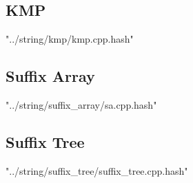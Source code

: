 \documentclass [5pt,twocolumn,oneside]{article}
\begin{document}
\begin{landscape}
\begin{multicols}{3}
\subsection{ KMP}
 {"../string/kmp/kmp.cpp.hash"}


\subsection{ Suffix Array}
 {"../string/suffix_array/sa.cpp.hash"}


\subsection{ Suffix Tree}
 {"../string/suffix_tree/suffix_tree.cpp.hash"}

\end{multicols}
\end{landscape}
\end{document}
